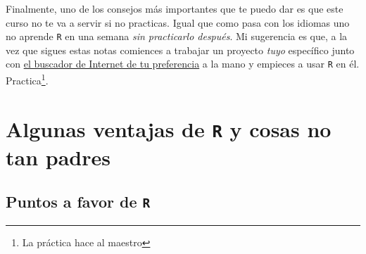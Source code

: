 \documentclass[]{tufte-book}
\begin{document}
Finalmente, uno de los consejos más importantes que te puedo dar es que
este curso no te va a servir si no practicas. Igual que como pasa con
los idiomas uno no aprende \texttt{R} en una semana \emph{sin
practicarlo después}. Mi sugerencia es que, a la vez que sigues estas
notas comiences a trabajar un proyecto \emph{tuyo} específico junto con
\href{https://duckduckgo.com/}{el buscador de Internet de tu
preferencia} a la mano y empieces a usar \texttt{R} en él.
Practica\footnote{La práctica hace al maestro}.

\hypertarget{algunas-ventajas-de-r-y-cosas-no-tan-padres}{%
\section{\texorpdfstring{Algunas ventajas de \texttt{R} y cosas no tan
padres}{Algunas ventajas de R y cosas no tan padres}}\label{algunas-ventajas-de-r-y-cosas-no-tan-padres}}

\hypertarget{puntos-a-favor-de-r}{%
\subsection{\texorpdfstring{Puntos a favor de
\texttt{R}}{Puntos a favor de R}}\label{puntos-a-favor-de-r}}
\end{document}
